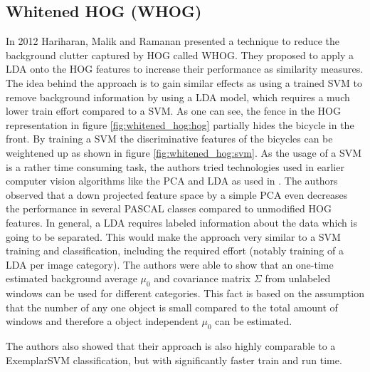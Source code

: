 \subsection{Whitened HOG (WHOG)}
\label{sec:whitened_hog}

In 2012 Hariharan, Malik and Ramanan presented a technique \cite{Hariharan2012} to reduce the background clutter captured by \ac{HOG} called \acf{WHOG}. They proposed to apply a \ac{LDA} onto the \ac{HOG} features to increase their performance as similarity measures. The idea behind the approach is to gain similar effects as using a trained \ac{SVM} to remove background information by using a \ac{LDA} model, which requires a much lower train effort compared to a \ac{SVM}. As one can see, the fence in the \ac{HOG} representation in figure \ref{fig:whitened_hog:hog} partially hides the bicycle in the front. By training a \ac{SVM} the discriminative features of the bicycles can be weightened up as shown in figure \ref{fig:whitened_hog:svm}. As the usage of a \ac{SVM} is a rather time consuming task, the authors tried technologies used in earlier computer vision algorithms like the \ac{PCA} \cite{jolliffe2002principal} and \ac{LDA} as used in \cite{ahonen2006face}. The authors observed that a down projected feature space by a simple \ac{PCA} even decreases the performance in several PASCAL \cite{Pascal2007} classes compared to unmodified \ac{HOG} features. In general, a \ac{LDA} requires labeled information about the data which is going to be separated. This would make the approach very similar to a \ac{SVM} training and classification, including the required effort (notably training of a \ac{LDA} per image category). The authors were able to show that an one-time estimated background average $\mu_0$ and covariance matrix $\Sigma$ from unlabeled windows can be used for different categories. This fact is based on the assumption that the number of any one object is small compared to the total amount of windows and therefore a object independent $\mu_0$ can be estimated.

The authors also showed that their approach is also highly comparable to a ExemplarSVM classification, but with significantly faster train and run time. 

